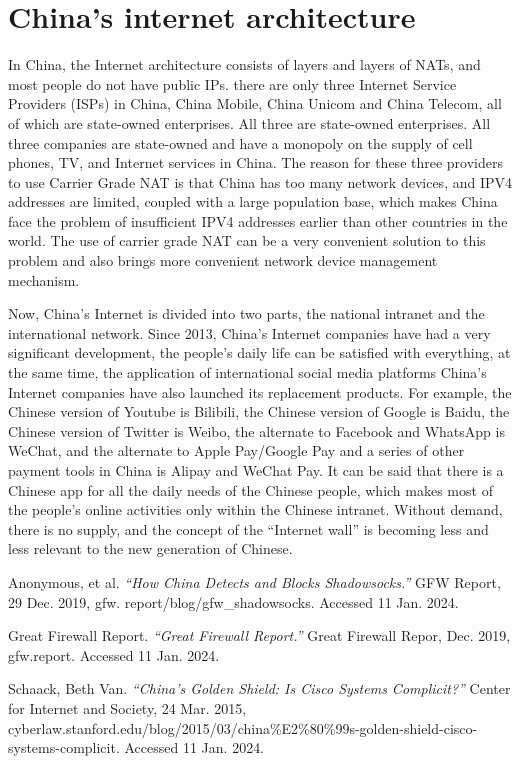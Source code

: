 \documentclass[11pt]{article}
\begin{document}
\section{China's internet architecture}
In China, the Internet architecture consists of layers and layers of NATs, and
most people do not have public IPs. there are only three Internet Service
Providers (ISPs) in China, China Mobile, China Unicom and China Telecom, all of
which are state-owned enterprises. All three are state-owned enterprises. All
three companies are state-owned and have a monopoly on the supply of cell phones,
TV, and Internet services in China. The reason for these three providers to use
Carrier Grade NAT is that China has too many network devices, and IPV4 addresses
are limited, coupled with a large population base, which makes China face the
problem of insufficient IPV4 addresses earlier than other countries in the world.
The use of carrier grade NAT can be a very convenient solution to this problem
and also brings more convenient network device management mechanism.

Now, China's Internet is divided into two parts, the national intranet and the
international network. Since 2013, China's Internet companies have had a very
significant development, the people's daily life can be satisfied with
everything, at the same time, the application of international social media
platforms China's Internet companies have also launched its replacement products.
For example, the Chinese version of Youtube is Bilibili, the Chinese version of
Google is Baidu, the Chinese version of Twitter is Weibo, the alternate to
Facebook and WhatsApp is WeChat, and the alternate to Apple Pay/Google Pay and a
series of other payment tools in China is Alipay and WeChat Pay. It can be said
that there is a Chinese app for all the daily needs of the Chinese people, which
makes most of the people's online activities only within the Chinese intranet.
Without demand, there is no supply, and the concept of the ``Internet wall'' is
becoming less and less relevant to the new generation of Chinese.

\newpage

\begin{thebibliography}{9}
	 Anonymous, et al. \textit{``How China Detects
		and Blocks Shadowsocks.''} GFW Report, 29 Dec. 2019, gfw.
	report/blog/gfw\_shadowsocks. Accessed 11 Jan. 2024.

	 Great Firewall Report. \textit{``Great Firewall Report.''}
	Great Firewall Repor, Dec. 2019, gfw.report. Accessed 11 Jan. 2024.

	Schaack, Beth Van. \textit{``China's Golden Shield: Is Cisco Systems Complicit?''} Center
	for Internet and Society, 24 Mar. 2015, cyberlaw.stanford.edu/blog/2015/03/china\%E2\%80\%99s-golden-shield-cisco-systems-complicit.
	Accessed 11 Jan. 2024.

\end{thebibliography}
\end{document}
